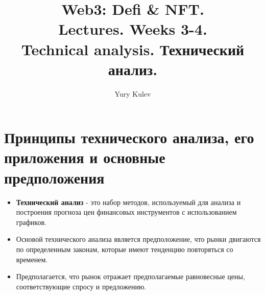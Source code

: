 \documentclass{article}
\title{Web3: Defi \& NFT.\\
Lectures. Weeks 3-4. \\
Technical analysis. Технический анализ.}
\author{Yury Kulev}
\begin{document}
\maketitle

\setcounter{tocdepth}{1} %
\renewcommand\contentsname{Contents}
\tableofcontents
\newpage

\renewcommand{\labelitemi}{\tiny$\bullet$}

 \section{Принципы технического анализа, его приложения и основные предположения}
 \begin{itemize}
     \item \textbf{Технический анализ} - это набор методов, используемый для анализа и построения прогноза цен финансовых инструментов с использованием графиков.

     \item Основой технического анализа является предположение, что рынки двигаются по определенным законам, которые имеют тенденцию повторяться со временем.

     \item Предполагается, что рынок отражает предполагаемые равновесные цены, соответствующие спросу и предложению.
 \end{itemize}
\end{document}
